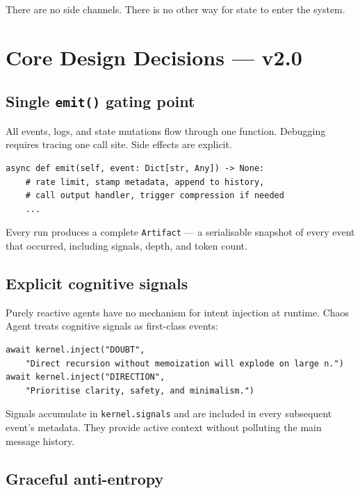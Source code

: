 \documentclass[11pt, a4paper]{article}
\begin{document}
There are no side channels. There is no other way for state to enter the system.

\section{Core Design Decisions — v2.0}

\subsection{Single \texttt{emit()} gating point}

All events, logs, and state mutations flow through one function. Debugging
requires tracing one call site. Side effects are explicit.

\begin{lstlisting}[caption={All events enter through a single function}]
async def emit(self, event: Dict[str, Any]) -> None:
    # rate limit, stamp metadata, append to history,
    # call output handler, trigger compression if needed
    ...
\end{lstlisting}


Every run produces a complete \texttt{Artifact} — a serialisable snapshot of
every event that occurred, including signals, depth, and token count.

\subsection{Explicit cognitive signals}

Purely reactive agents have no mechanism for intent injection at runtime.
Chaos Agent treats cognitive signals as first-class events:

\begin{lstlisting}[caption={Signals shape reasoning before execution begins}]
await kernel.inject("DOUBT",
    "Direct recursion without memoization will explode on large n.")
await kernel.inject("DIRECTION",
    "Prioritise clarity, safety, and minimalism.")
\end{lstlisting}

Signals accumulate in \texttt{kernel.signals} and are included in every
subsequent event's metadata. They provide active context without polluting the
main message history.

\subsection{Graceful anti-entropy}
\end{document}

